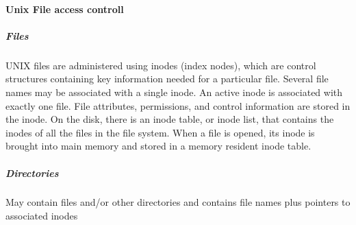 \documentclass{article}
\begin{document}
                        \paragraph{Unix File access controll}

                            \subparagraph{Files}
                            UNIX files are administered using inodes (index nodes), which are control structures containing key information needed for a particular file. Several file names may be associated with a single inode. An active inode is associated with exactly one file. File attributes, permissions, and control information are stored in the inode. On the disk, there is an inode table, or inode list, that contains the inodes of all the files in the file system. When a file is opened, its inode is brought into main memory and stored in a memory resident inode table.
                            \subparagraph{Directories} 
                            May contain files and/or other directories
                            and contains file names plus pointers to associated inodes
                            
\end{document}
